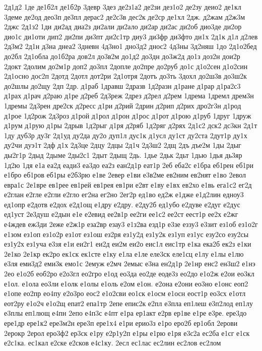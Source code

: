 2д1д2
1де
де1б2л
де1б2р
3девр
3дез
де2з1а2
де2зи
дез1о2
де2зу
деио2
де1кл
3деме
де2од
део3п
де3пл
дерас2
де2с3в
дес2к
де2ср
де1хл
2дж.
д2жам
д2ж3м
2джс
2д1з2
1ди
ди2ад
диа2з
ди2али
ди2ало
ди2ар
ди2ас
ди2об
дио3де
ди2ор
дио1с
ди1оти
дип2
ди2пи
ди3пт
ди2с1тр
диу3
ди3фр
ди3фто
ди1х
2д1к
д1л
д2лев
2д3м2
2д1н
д3на
днеа2
3дневн
4д3но1
дно3д2
днос2
4д3ны
3д2няш
1до
2д1о2бед
до2бл
2д1обла
до1б2ра
дов2л
до3в2м
до1д2
до3дн
до3ж2д
до1з
доз2н
дои2р
2докт
2долим
до2м1р
доп2
до3пл
2допле
до2пре
до2руб
до1с
д1о2сен
д1о2син
2д1осно
дос2п
2дотд
2дотл
дот2ри
2д1отря
2дотъ
до3ть
3дохл
до2ш3в
до3ш2к
до2шлы
до2щу
2дп
2др.
д1раб
1дравш
2дразв
1д2разн
д1ране
д1рар
д1ра2с3
д1рах
д1рач
д2раю
д1ре
д2реб
2д3реж
2дрез
д2рел
д2рем
1дрема
1дремл
дрем3н
1дремы
2д3рен
дре2ск
д2ресс
д1ри
д2рий
2дрин
д2рип
д2рих
дро2г3н
д1род
д1рое
1д2рож
2д3роз
д1рой
д1рол
д1рон
д1рос
д1рот
д1рою
д1руб
1друг
1друж
д1рум
д1рую
д1ры
2дрыв
1д2рыг
д1ря
д2ряб
1д2ряг
д2рях
2д1с2
дск2
дс3кн
2д1т
1ду
дуб3р
ду3г
2д1уд
ду2да
ду2о
дуп1л
дус1к
д1усл
ду1ст
ду2ста
2дут1р
ду1х
ду2чи
дуэ1т
2дф
д1х
2д3це
2дцу
2дцы
2д1ч
2д3ш2
2дщ
2дъ
дъе2м
1ды
2дыг
ды2г1р
2дыд
2дыме
2ды2с1
2дыт
2дыщ
2дь.
1дье
2дьк
2дьт
1дью
1дья
дь3яр
1д2ю
1дя
е1а
еа2д
еади3
еа3до
еа2з
еан2д1р
еат1р
2еб
еба2с
е1бра
еб1рен
еб1ри
е1бро
еб1ров
еб1ры
е2б3рю
е1ве
2евер
е1ви
е3в2ме
ев2ним
ев2нят
е1во
2евол
евра1с
2е1вре
ев1рее
ев1рей
ев1рея
ев1ри
е2вт
е1ву
е1вх
ев2хо
е1вь
ега1с2
ег2д
е2глан
е2гле
е2гли
е2гло
ег2на
ег2но
2ег2р
ед1во
ед2ж
е1дже
е1д2лин
едноу3
ед1опр
е2дотв
е2дох
е2д1ощ
е1дру
е2дру.
е2ду2б
ед1убо
е2дуве
е2дуг
е2дус
ед1уст
2е3душ
е2дын
е1е
е2евид
ее2в1р
ее2ги
ее1с2
ее2ст
еест1р
ее2х
е2жг
е4ждев
еж3ди
2еже
е2ж1р
еза2вр
езау3
е1з2ва
езд1р
е3зе
еззу3
е3зит
ез1об
ез1о2г
е1зом
ез1оп
ез1о2р
ез1от
ез1ош
ез2ря
ез1у2д
ез1у2к
ез1уп
ез1ус
езу2со
езу2сы
ез1у2х
ез1уча
е3зя
е1и
еи2г1
еи2д
еи2м
еи2о
еис1л
еис1тр
е1ка
ека2б
ек2з
е1ки
2е1ко
2е1кр
ек2ро
ек1ск
ек1сте
е1ку
е1ла
е1ле
еле3ск
еле1сц
е1лу
е1лы
е1лю
е3ля
еми3д2
еми3к
емо1с
2емуж
е2мч
2емыс
е3на
ен2д1р
2е1нр
енс2
ен3ш2
е1нэ
2ео
е1о2б
еоб2ро
е2о3гл
ео2гро
е1од
ео3да
ео2де
еоде3з
ео2до
е1о2ж
е2ои
ео3кл
е1ол.
е1ола
ео3ли
е1олк
е1олы
е1оль
е2ом
е1он.
е2она
е2они
ео3но
е1онс
еоп2
е1опе
ео2пр
ео4пу
е2о3ро
еос2
е1о2сви
ео1ск
е1осм
е1осн
еост1р
ео3сх
е1отл
еот2ру
е1о2ч
е1о2щ
епат2
епа1тр
2епе
епис2к
е2пл
е3пла
еп1леш
е3п2лод
еп1лу
е3плы
еп1лющ
е4пн
2епо
е4п3с
е4пт
е1ра
ер1акт
е2рв
ер1ве
е1ре
е3ре.
ере3до
ере1др
ере1к2
ере3м2н
ере3п
ере1х4
е1ри
ерио3з
е1ро
еро2б
ер1обл
2ерови
2ерокр
2ерол
еро3ф2
ер3ск
е1ру
е2р1у2п
е1ры
е1рю
е1ря
е3с2а
ес2ба
е1сг
е1ск
е2с1ка.
ес1кал
е2ске
е2сков
е4с1ку.
2есл
ес1лас
ес2лин
ес2лов
ес2лом
